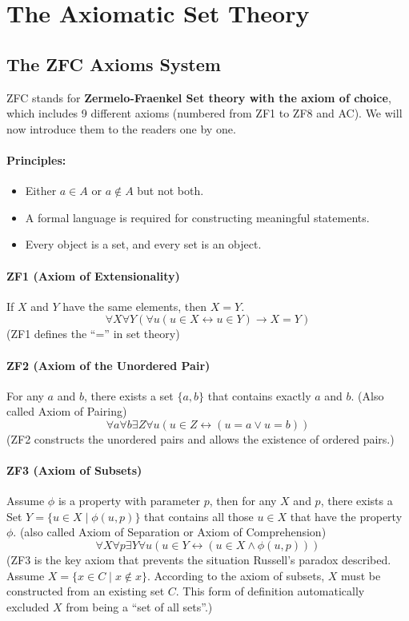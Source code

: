 \documentclass[oneside]{book}
\begin{document}
\section{The Axiomatic Set Theory}

\subsection{The ZFC Axioms System}
ZFC stands for \textbf{Zermelo-Fraenkel Set theory with the axiom of choice}, which includes 9 different axioms (numbered from ZF1 to ZF8 and AC). We will now introduce them to the readers one by one.

\paragraph{Principles:}
\begin{itemize}
    \item Either $a \in A$ or $a \notin A$ but not both.
    \item A formal language is required for constructing meaningful statements.
    \item Every object is a set, and every set is an object.
\end{itemize}

\paragraph{ZF1 (Axiom of Extensionality)}
If $X$ and $Y$ have the same elements, then $X = Y$.
$$ \forall X \forall Y (\forall u (u \in X \leftrightarrow u \in Y) \to X = Y) $$
(ZF1 defines the “=” in set theory)

\paragraph{ZF2 (Axiom of the Unordered Pair)}
For any $a$ and $b$, there exists a set $\{a,b\}$ that contains exactly $a$ and $b$. (Also called Axiom of Pairing)
$$ \forall a \forall b \exists Z \forall u (u \in Z \leftrightarrow (u = a \vee u = b)) $$
(ZF2 constructs the unordered pairs and allows the existence of ordered pairs.)

\paragraph{ZF3 (Axiom of Subsets)}
Assume $\phi$ is a property with parameter $p$, then for any $X$ and $p$, there exists a Set $Y = \{u \in X \mid \phi(u, p)\}$ that contains all those $u \in X$ that have the property $\phi$. (also called Axiom of Separation or Axiom of Comprehension)
$$ \forall X \forall p \exists Y \forall u (u \in Y \leftrightarrow (u \in X \wedge \phi(u, p))) $$
(ZF3 is the key axiom that prevents the situation Russell’s paradox described. Assume $X = \{ x \in C \mid x \notin x \}$. According to the axiom of subsets, $X$ must be constructed from an existing set $C$. This form of definition automatically excluded $X$ from being a “set of all sets”.)
\end{document}
